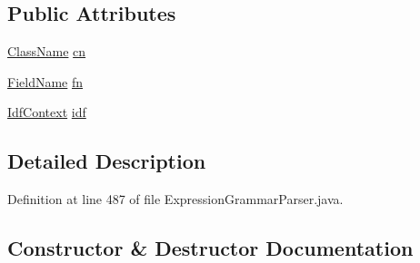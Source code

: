 \subsection*{Public Attributes}
\begin{DoxyCompactItemize}
\item 
\hyperlink{classgov_1_1nasa_1_1jpf_1_1inspector_1_1utils_1_1expressions_1_1_class_name}{Class\+Name} \hyperlink{classgov_1_1nasa_1_1jpf_1_1inspector_1_1server_1_1expression_1_1parser_1_1_expression_grammar_parser_1_1_field_name_context_a228decb1dbee418574b6330457fa7d98}{cn}
\item 
\hyperlink{classgov_1_1nasa_1_1jpf_1_1inspector_1_1utils_1_1expressions_1_1_field_name}{Field\+Name} \hyperlink{classgov_1_1nasa_1_1jpf_1_1inspector_1_1server_1_1expression_1_1parser_1_1_expression_grammar_parser_1_1_field_name_context_ae17403c0cb3dc8561895a7e24a0af8f7}{fn}
\item 
\hyperlink{classgov_1_1nasa_1_1jpf_1_1inspector_1_1server_1_1expression_1_1parser_1_1_expression_grammar_parser_1_1_idf_context}{Idf\+Context} \hyperlink{classgov_1_1nasa_1_1jpf_1_1inspector_1_1server_1_1expression_1_1parser_1_1_expression_grammar_parser_1_1_field_name_context_aea8caf78d6c50ce4bb13d90d6d9c92a1}{idf}
\end{DoxyCompactItemize}


\subsection{Detailed Description}


Definition at line 487 of file Expression\+Grammar\+Parser.\+java.



\subsection{Constructor \& Destructor Documentation}
